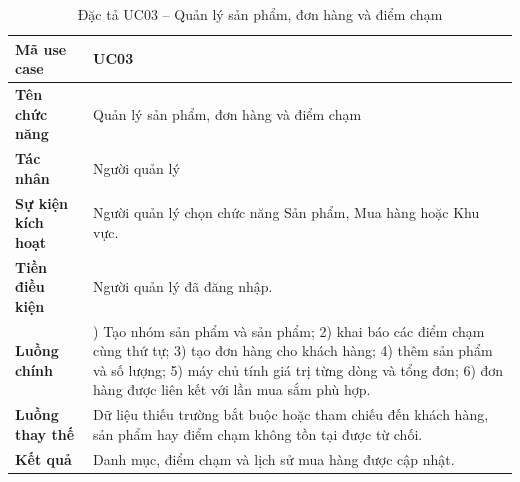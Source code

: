 \documentclass[../LuanVan.tex]{subfiles}
\begin{document}
\begin{table}[H]
    \centering
    \caption{Đặc tả UC03 -- Quản lý sản phẩm, đơn hàng và điểm chạm}
    \label{tab:uc03_catalog_ch4}
    \begin{tabular}{|>{\raggedright\arraybackslash}p{3.0cm}|>{\raggedright\arraybackslash}p{10.9cm}|}
        \hline
        \textbf{Mã use case} & UC03 \\
        \hline
        \textbf{Tên chức năng} & Quản lý sản phẩm, đơn hàng và điểm chạm \\
        \hline
        \textbf{Tác nhân} & Người quản lý \\
        \hline
        \textbf{Sự kiện kích hoạt} & Người quản lý chọn chức năng Sản phẩm, Mua hàng hoặc Khu vực. \\
        \hline
        \textbf{Tiền điều kiện} & Người quản lý đã đăng nhập. \\
        \hline
        \textbf{Luồng chính} & 1) Tạo nhóm sản phẩm và sản phẩm; 2) khai báo các điểm chạm cùng thứ tự; 3) tạo đơn hàng cho khách hàng; 4) thêm sản phẩm và số lượng; 5) máy chủ tính giá trị từng dòng và tổng đơn; 6) đơn hàng được liên kết với lần mua sắm phù hợp. \\
        \hline
        \textbf{Luồng thay thế} & Dữ liệu thiếu trường bắt buộc hoặc tham chiếu đến khách hàng, sản phẩm hay điểm chạm không tồn tại được từ chối. \\
        \hline
        \textbf{Kết quả} & Danh mục, điểm chạm và lịch sử mua hàng được cập nhật. \\
        \hline
    \end{tabular}
\end{table}
\end{document}
